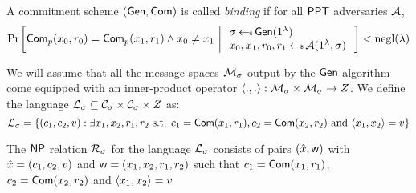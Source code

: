 \begin{definition}\label{defn:bindingcomm}
A commitment scheme $(\mathsf{Gen},\mathsf{Com})$ is called {\em binding} if for all $\mathsf{PPT}$ adversaries $\mathcal{A}$, 
\begin{align*}
\condprob{\com_p(x_0,r_0)=\com_p(x_1,r_1)\wedge x_0\neq x_1}{
\begin{array}{l}
\sigma\sample \gen(\secparam) \\
x_0,x_1,r_0,r_1 \sample \adv(\secparam,\sigma)
\end{array}
} < \negl(\lambda)
\end{align*}

\end{definition}

We will assume that all the message spaces $\mathcal{M}_\sigma$ output by the $\mathsf{Gen}$ algorithm come equipped with an inner-product operator $\langle .,.\rangle:\mathcal{M}_\sigma\times \mathcal{M}_\sigma\rightarrow Z$. We define the language $\mathcal{L}_\sigma\subseteq \mathcal{C}_\sigma\times \mathcal{C}_\sigma\times Z$ as:
\begin{equation*}
\mathcal{L}_\sigma = \{(c_1,c_2,v):\exists x_1,x_2,r_1,r_2 \text{ s.t. }
c_1=\mathsf{Com}(x_1,r_1), c_2=\mathsf{Com}(x_2,r_2) \text{ and } \langle x_1,x_2\rangle=v\} 
\end{equation*}

The $\mathsf{NP}$ relation $\mathcal{R}_\sigma$ for the language $\mathcal{L}_\sigma$ consists of pairs $(\hat{x},\mathsf{w})$ with $\hat{x}=(c_1,c_2,v)$ and $\mathsf{w}=(x_1,x_2,r_1,r_2)$ such that $c_1=\mathsf{Com}(x_1,r_1)$, $c_2=\mathsf{Com}(x_2,r_2)$ and $\langle x_1,x_2\rangle=v$ 

